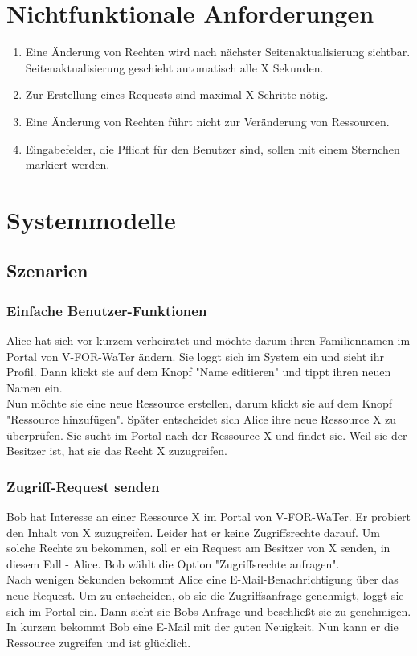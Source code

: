 \documentclass[parskip=full,11pt]{scrartcl}
\def\threedigits#1{%
  \ifnum#1<10 0\fi
  \ifnum#1<1 0\fi
  \number#1}
\begin{document}
\section{Nichtfunktionale Anforderungen}
\begin{enumerate}[label={\textbf{/NF\protect\threedigits{\theenumi}0/}}, leftmargin=*]
\item Eine Änderung von Rechten wird nach nächster Seitenaktualisierung sichtbar. Seitenaktualisierung geschieht automatisch alle X Sekunden.
\item Zur Erstellung eines Requests sind maximal X Schritte nötig.
\item Eine Änderung von Rechten führt nicht zur Veränderung von Ressourcen.
\item Eingabefelder, die Pflicht für den Benutzer sind, sollen mit einem Sternchen markiert werden.
\end{enumerate}



\section{Systemmodelle}
\subsection{Szenarien}
\subsubsection*{Einfache Benutzer-Funktionen}
Alice hat sich vor kurzem verheiratet und möchte darum ihren Familiennamen im Portal von V-FOR-WaTer ändern. Sie loggt sich im System ein und sieht ihr Profil. Dann klickt sie auf dem Knopf "Name editieren" und tippt ihren neuen Namen ein. \\
Nun möchte sie eine neue Ressource erstellen, darum klickt sie auf dem Knopf "Ressource hinzufügen". Später entscheidet sich Alice ihre neue Ressource X zu überprüfen. Sie sucht im Portal nach der Ressource X und findet sie. Weil sie der Besitzer ist, hat sie das Recht X zuzugreifen.
\subsubsection*{Zugriff-Request senden}
Bob hat Interesse an einer Ressource X im Portal von V-FOR-WaTer. Er probiert den Inhalt von X zuzugreifen. Leider hat er keine Zugriffsrechte darauf. Um solche Rechte zu bekommen, soll er ein Request am Besitzer von X senden, in diesem Fall - Alice. Bob wählt die Option "Zugriffsrechte anfragen". \\
Nach wenigen Sekunden bekommt Alice eine E-Mail-Benachrichtigung über das neue Request. Um zu entscheiden, ob sie die Zugriffsanfrage genehmigt, loggt sie sich im Portal ein. Dann sieht sie Bobs Anfrage und beschließt sie zu genehmigen. In kurzem bekommt Bob eine E-Mail mit der guten Neuigkeit. Nun kann er die Ressource zugreifen und ist glücklich.
\end{document}
